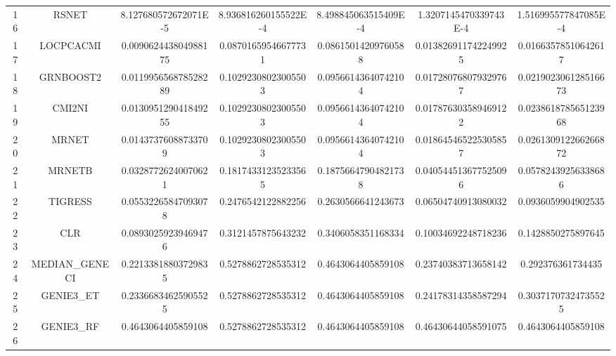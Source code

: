 \documentclass[a4paper,10pt]{article}
\begin{document}
\begin{landscape}
\begin{table}[!htp]
\begin{tabular}{ccccccc}
16&RSNET&8.127680572672071E-5&8.936816260155522E-4&8.498845063515409E-4&1.3207145470339743E-4&1.516995577847085E-4\\
17&LOCPCACMI&0.009062443804988175&0.08701659546677731&0.08615014209760588&0.013826911742249925&0.01663578510642617\\
18&GRNBOOST2&0.011995656878528289&0.10292308023005503&0.09566143640742104&0.017280768079329767&0.021902306128516673\\
19&CMI2NI&0.013095129041849255&0.10292308023005503&0.09566143640742104&0.017876303589469122&0.023861878565123968\\
20&MRNET&0.01437376088733709&0.10292308023005503&0.09566143640742104&0.018645465225305857&0.026130912266266872\\
21&MRNETB&0.03287726240070621&0.18174331235233565&0.18756647904821738&0.040544513677525096&0.05782439256338686\\
22&TIGRESS&0.05532265847093078&0.2476542122882256&0.2630566641243673&0.06504740913080032&0.0936059904902535\\
23&CLR&0.08930259239469476&0.3121457875643232&0.3406058351168334&0.10034692248718236&0.1428850275897645\\
24&MEDIAN_GENECI&0.22133818803729835&0.5278862728535312&0.4643064405859108&0.23740383713658142&0.292376361734435\\
25&GENIE3_ET&0.23366834625905525&0.5278862728535312&0.4643064405859108&0.24178314358587294&0.30371707324735525\\
26&GENIE3_RF&0.4643064405859108&0.5278862728535312&0.4643064405859108&0.46430644058591075&0.4643064405859108\\
\hline
\end{tabular}
\end{table}


\newpage


\end{landscape}
\end{document}
